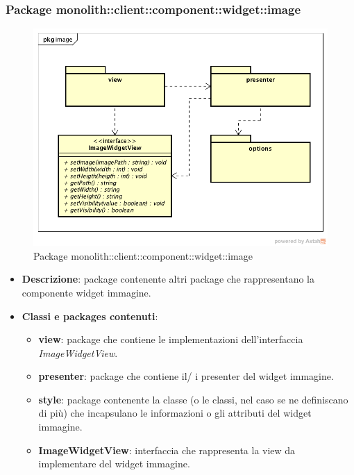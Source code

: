 \subsubsection{Package monolith::client::component::widget::image}
\label{Package monolith::client::component::widget:image}
\begin{figure}[H]
	\centering
	\includegraphics[scale=0.5]{Sezioni/Packages/SDK/image.png}
	\caption{Package monolith::client::component::widget::image}
\end{figure}
\begin{itemize}
\item \textbf{Descrizione}: package contenente altri package che rappresentano la componente widget immagine.
\item \textbf{Classi e packages contenuti}:
\begin{itemize}
\item \textbf{view}: package che contiene le implementazioni dell'interfaccia \textit{ImageWidgetView}.
\item \textbf{presenter}: package che contiene il/ i presenter del widget immagine.
\item \textbf{style}: package contenente la classe (o le classi, nel caso se ne definiscano di più) che incapsulano le informazioni o gli attributi del widget immagine.
\item \textbf{ImageWidgetView}: interfaccia che rappresenta la view da implementare del widget immagine.
\end{itemize}
\end{itemize}

